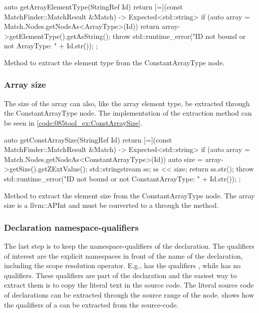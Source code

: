 \begin{listing}[H]
    \begin{cppcode}
auto getArrayElementType(StringRef Id) {
    return [=](const MatchFinder::MatchResult &Match) -> Expected<std::string> {
        if (auto array = Match.Nodes.getNodeAs<ArrayType>(Id)) {
            return array->getElementType().getAsString();
        }
        throw std::runtime_error("ID not bound or not ArrayType: " + Id.str());
    };
}
    \end{cppcode}
    \caption{Method to extract the element type from the ConstantArrayType node.}
    \label{code:085tool_ex:ArrayElemtType}
\end{listing}

\subsubsection*{Array size}

The size of the array can also, like the array element type, be extracted through the ConstantArrayType node. The implementation of the extraction method can be seen in \cref{code:085tool_ex:ConstArraySize}.

\begin{listing}[H]
    \begin{cppcode}
auto getConstArraySize(StringRef Id) {
    return [=](const MatchFinder::MatchResult &Match) -> Expected<std::string> {
        if (auto array = Match.Nodes.getNodeAs<ConstantArrayType>(Id)) {
            auto size = array->getSize().getZExtValue();
            std::stringstream ss;
            ss << size;
            return ss.str();
        }
        throw std::runtime_error("ID not bound or not ConstantArrayType: " + Id.str());
    };
}
    \end{cppcode}
    \caption{Method to extract the element size from the ConstantArrayType node. The array size is a llvm::APInt and must be converted to a  through the  method.}
    \label{code:085tool_ex:ConstArraySize}
\end{listing}

\subsubsection*{Declaration namespace-qualifiers}

The last step is to keep the namespace-qualifiers of the declaration. The qualifiers of interest are the explicit namespaces in front of the name of the declaration, including the scope resolution operator. E.g.,  has the qualifiers , while  has no qualifiers.
These qualifiers are part of the declaration and the easiest way to extract them is to copy the literal text in the source code. The literal source code of declarations can be extracted through the source range of the node.  shows how the qualifiers of a  can be extracted from the source-code.


